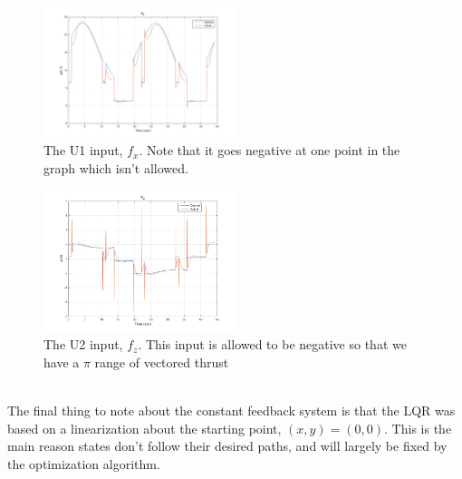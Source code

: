 \documentclass[journal]{IEEEtran}
\begin{document}
\begin{figure}[h!]
    \centering
    \includegraphics[width=0.5\textwidth]{U1_Constant_Gain_LQR.png}
    \caption{The U1 input, $f_x$. Note that it goes negative at one point in the graph which isn't allowed.}
\end{figure}
\begin{figure}[h!]
    \centering
    \includegraphics[width=0.5\textwidth]{U2_Constant_Gain_LQR.png}
    \caption{The U2 input, $f_z$. This input is allowed to be negative so that we have a $\pi$ range of vectored thrust}
\end{figure}\\
\indent The final thing to note about the constant feedback system is that the LQR was based on a linearization about the starting point, $(x,y)=(0,0)$. This is the main reason states don't follow their desired paths, and will largely be fixed by the optimization algorithm.
\end{document}
